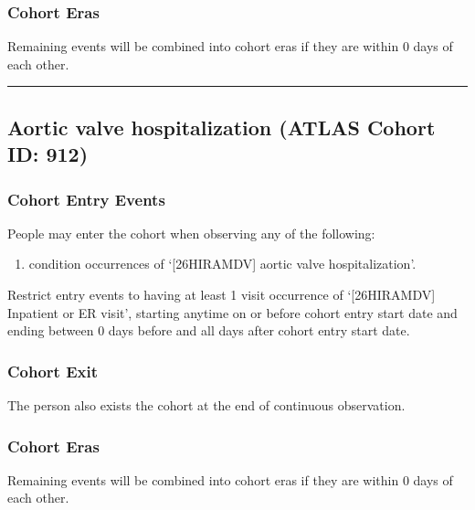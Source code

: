 \documentclass[
  12pt,
]{article}
\providecommand{\tightlist}{%
  \setlength{\itemsep}{0pt}\setlength{\parskip}{0pt}}
\begin{document}
\subsubsection{Cohort Eras}\label{cohort-eras-11}

Remaining events will be combined into cohort eras if they are within 0
days of each other.

\begin{center}\rule{0.5\linewidth}{0.5pt}\end{center}

\subsection{Aortic valve hospitalization (ATLAS Cohort ID:
912)}\label{aortic-valve-hospitalization-atlas-cohort-id-912}

\subsubsection{Cohort Entry Events}\label{cohort-entry-events-12}

People may enter the cohort when observing any of the following:

\begin{enumerate}
\def\labelenumi{\arabic{enumi}.}
\tightlist
\item
  condition occurrences of `{[}26HIRAMDV{]} aortic valve
  hospitalization'.
\end{enumerate}

Restrict entry events to having at least 1 visit occurrence of
`{[}26HIRAMDV{]} Inpatient or ER visit', starting anytime on or before
cohort entry start date and ending between 0 days before and all days
after cohort entry start date.

\subsubsection{Cohort Exit}\label{cohort-exit-12}

The person also exists the cohort at the end of continuous observation.

\subsubsection{Cohort Eras}\label{cohort-eras-12}

Remaining events will be combined into cohort eras if they are within 0
days of each other.
\end{document}
